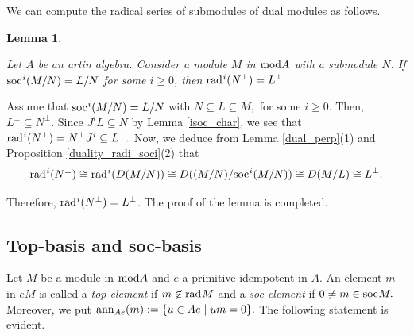 \documentclass[10pt]{amsart}
\newtheorem{Lemma}[Theo]{Lemma}
\theoremstyle{definition}
\newcommand{\mmod}{{\rm mod}}
\newcommand{\rad}{{\rm rad}\hspace{.5pt}}
\newcommand{\soc}{{\rm soc}\hspace{.5pt}}
\begin{document}
\smallskip

We can compute the radical series of submodules of dual modules as follows.

\begin{Lemma}\label{rad_perp}

Let $A$ be an artin algebra. Consider a module $M$ in $\mmod A$ with a submodule $N$. If $\soc^i(M/N)=L/N$ for some $i\ge 0$, %
then $\rad^i(N^\perp)=L^\perp.$ 

\end{Lemma}

\vspace{-1.5pt}

 Assume that $\soc^i(M/N)=L/N$ with $N\subseteq L\subseteq M,$ for some $i\ge 0.$ Then, $L^\perp \subseteq N^\perp$. Since $J^iL\subseteq N$ by Lemma \ref{isoc_char}, we see that $\rad^i(N^\perp)= N^\perp J^i \subseteq L^\perp.$ Now, we deduce from Lemma \ref{dual_perp}(1) and Proposition \ref{duality_radi_soci}(2) that
\vspace{-2pt}
$$\rad^i(N^\perp) \cong \rad^i(D(M/N))
\cong D((M/N)/\soc^i(M/N))\cong D(M/L)\cong L^\perp.\vspace{-3pt}$$  

Therefore, $\rad^i(N^\perp)=L^\perp$. The proof of the lemma is completed.


\subsection{\sc Top-basis and soc-basis} Let $M$ be a module in $\mmod A$ and $e$ a primitive idempotent in $A.$ An element $m$ in $eM$ is called a {\it top-element} if $m\not\in \rad M$ and a {\it soc-element} if $0\ne m\in \soc M.$ Moreover, we put ${\rm ann}_{Ae}(m):=\{u\in Ae \mid u m=0\}.$ The following statement is evident. 
%
\end{document}
